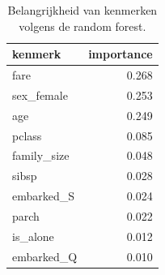 \begin{table}[htbp]
\caption{Belangrijkheid van kenmerken volgens de random forest.}
\label{tab:importances}
\begin{tabular}{lr}
\toprule
kenmerk & importance \\
\midrule
fare & 0.268 \\
sex\_female & 0.253 \\
age & 0.249 \\
pclass & 0.085 \\
family\_size & 0.048 \\
sibsp & 0.028 \\
embarked\_S & 0.024 \\
parch & 0.022 \\
is\_alone & 0.012 \\
embarked\_Q & 0.010 \\
\bottomrule
\end{tabular}
\end{table}
